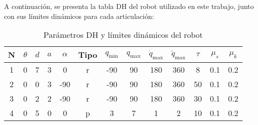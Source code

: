 A continuación, se presenta la tabla DH del robot utilizado en este trabajo, junto con sus límites dinámicos para cada articulación:

\begin{table}[H]
	\centering
	\caption{Parámetros DH y límites dinámicos del robot}
	\begin{tabular}{|c|c|c|c|c|c|c|c|c|c|c|c|c|}
		\hline
		\textbf{N} & \(\theta\) & \(d\) & \(a\) & \(\alpha\) & Tipo & \(q_{\text{min}}\) & \(q_{\text{max}}\) & \(\dot{q}_{\text{max}}\) & \(\ddot{q}_{\text{max}}\) & \(\tau\) & \(\mu_s\) & \(\mu_k\) \\
		\hline
		1 & 0 & 7 & 3 & 0 & r & -90 & 90 & 180 & 360 & 8  & 0.1 & 0.2 \\
		2 & 0 & 0 & 3 & -90 & r & -90 & 90 & 180 & 360 & 50 & 0.1 & 0.2 \\
		3 & 0 & 2 & 2 & -90 & r & -90 & 90 & 180 & 360 & 30 & 0.1 & 0.2 \\
		4 & 0 & 5 & 0 & 0 & p & 3 & 7 & 1 & 2 & 10 & 0.1 & 0.2 \\
		\hline
	\end{tabular}
	\label{tab:parametros_dh_robot}
\end{table}

